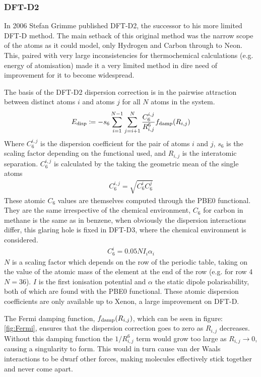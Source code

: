 \documentclass[10pt,a4paper,twocolumn,twoside]{extarticle}
\begin{document}
	\subsubsection{DFT-D2}
	In 2006 Stefan Grimme published DFT-D2\cite{Grimme2006}, 
	the successor to his more limited DFT-D method. The main setback of this original method was the narrow scope of the atoms as it could model, only Hydrogen and Carbon through to Neon. This, paired with very large inconsistencies for thermochemical calculations (e.g. energy of atomisation) made it a very limited method in dire need of improvement for it to become widespread.

	The basis of the DFT-D2 dispersion correction is in the pairwise attraction between distinct atoms $i$ and atoms $j$ for all $N$ atoms in the system. \cite{Grimme2006}
	\begin{align} \label{eq:D2}
	E_{\rm disp} \coloneqq -s_6 \sum^{N-1}_{i=1} \sum^N_{j=i+1} \frac{C^{i,j}_{6}}{R^6_{i,j}} f_{\rm damp}(R_{i,j})
	\end{align} 
	\noindent
	Where $C_6^{i,j}$ is the dispersion coefficient for the pair of atoms $i$ and $j$, $s_6$ is the scaling factor depending on the functional used, and $R_{i,j}$ is the interatomic separation. 
	$C_6^{i,j}$ is calculated by the taking the geometric mean of the single atoms 
	\begin{align} \label{eq:C6ij}
		C_6^{i,j} = \sqrt{C_6^i C_6^j}
	\end{align}
	These atomic $C_6$ values are themselves computed through the PBE0 functional\cite{Grimme2011}. They are the same irrespective of the chemical environment, $C_6$ for carbon in methane is the same as in benzene, when obviously the dispersion interactions differ, this glaring hole is fixed in DFT-D3, where the chemical environment is considered.
	\begin{align} \label{eq:C6i}
		C_6^i = 0.05NI_i \alpha_i
	\end{align}
	$N$ is a scaling factor which depends on the row of the periodic table, taking on the value of the atomic mass of the element at the end of the row (e.g. for row 4 $N = 36$). $I$ is the first ionisation potential and $\alpha$ the static dipole polarisability, both of which are found with the PBE$0$ functional. These atomic dispersion coefficients are only available up to Xenon, a large improvement on DFT-D.

	The Fermi damping function, $f_{\rm damp}(R_{i,j})$, which can be seen in figure: \ref{fig:Fermi}, ensures that the dispersion correction goes to zero as $R_{i,j}$ decreases. Without this damping function the $1/R_{i,j}^6$ term would grow too large as $R_{i,j} \rightarrow 0$, causing a singularity to form. This would in turn cause van der Waals interactions to be dwarf other forces, making molecules effectively stick together and never come apart.
\end{document}
